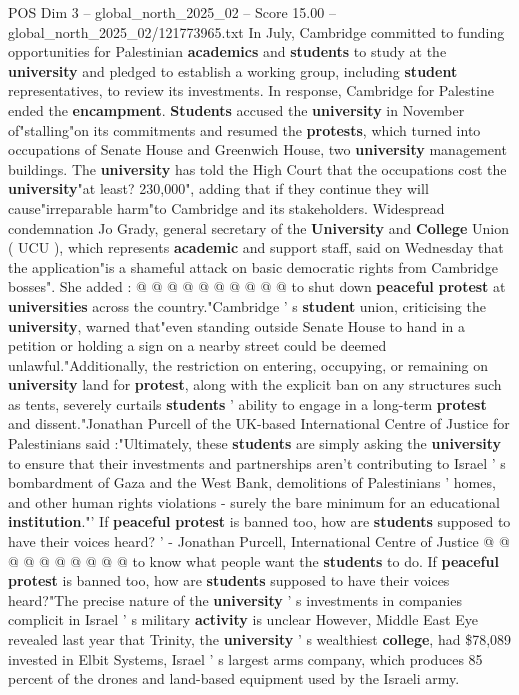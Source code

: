 \begin{textsample}{POS Dim 3 – global\_north\_2025\_02 – Score 15.00 – global\_north\_2025\_02/121773965.txt}
In July, Cambridge committed to funding opportunities for Palestinian \textbf{academics} and \textbf{students} to study at the \textbf{university} and pledged to establish a working group, including \textbf{student} representatives, to review its investments.
In response, Cambridge for Palestine ended the \textbf{encampment}. \textbf{Students} accused the \textbf{university} in November of"stalling"on its commitments and resumed the \textbf{protests}, which turned into occupations of Senate House and Greenwich House, two \textbf{university} management buildings.
The \textbf{university} has told the High Court that the occupations cost the \textbf{university}"at least? 230,000", adding that if they continue they will cause"irreparable harm"to Cambridge and its stakeholders.
Widespread condemnation Jo Grady, general secretary of the \textbf{University} and \textbf{College} Union ( UCU ), which represents \textbf{academic} and support staff, said on Wednesday that the application"is a shameful attack on basic democratic rights from Cambridge bosses".
She added : @ @ @ @ @ @ @ @ @ @ to shut down \textbf{peaceful} \textbf{protest} at \textbf{universities} across the country."Cambridge ' s \textbf{student} union, criticising the \textbf{university}, warned that"even standing outside Senate House to hand in a petition or holding a sign on a nearby street could be deemed unlawful."Additionally, the restriction on entering, occupying, or remaining on \textbf{university} land for \textbf{protest}, along with the explicit ban on any structures such as tents, severely curtails \textbf{students} ' ability to engage in a long-term \textbf{protest} and dissent."Jonathan Purcell of the UK-based International Centre of Justice for Palestinians said :"Ultimately, these \textbf{students} are simply asking the \textbf{university} to ensure that their investments and partnerships aren't contributing to Israel ' s bombardment of Gaza and the West Bank, demolitions of Palestinians ' homes, and other human rights violations - surely the bare minimum for an educational \textbf{institution}."' If \textbf{peaceful} \textbf{protest} is banned too, how are \textbf{students} supposed to have their voices heard? ' - Jonathan Purcell, International Centre of Justice @ @ @ @ @ @ @ @ @ @ to know what people want the \textbf{students} to do.
If \textbf{peaceful} \textbf{protest} is banned too, how are \textbf{students} supposed to have their voices heard?"The precise nature of the \textbf{university} ' s investments in companies complicit in Israel ' s military \textbf{activity} is unclear However, Middle East Eye revealed last year that Trinity, the \textbf{university} ' s wealthiest \textbf{college}, had \$78,089 invested in Elbit Systems, Israel ' s largest arms company, which produces 85 percent of the drones and land-based equipment used by the Israeli army.

\end{textsample}
